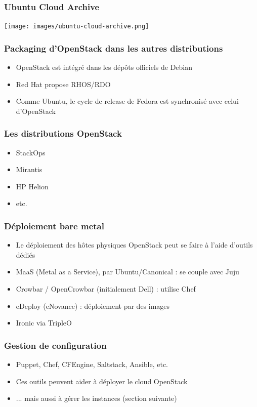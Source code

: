  \begin{frame}
    \frametitle{Ubuntu Cloud Archive}
    \texttt{[image: images/ubuntu-cloud-archive.png]}
  \end{frame}

  \begin{frame}
    \frametitle{Packaging d'OpenStack dans les autres distributions}
    \begin{itemize}
      \item OpenStack est intégré dans les dépôts officiels de Debian
      \item Red Hat propose RHOS/RDO
      \item Comme Ubuntu, le cycle de release de Fedora est synchronisé avec celui d'OpenStack
    \end{itemize}
  \end{frame}

  \begin{frame}
    \frametitle{Les distributions OpenStack}
    \begin{itemize}
      \item StackOps
      \item Mirantis
      \item HP Helion
      \item etc.
    \end{itemize}
  \end{frame}

  \begin{frame}
    \frametitle{Déploiement bare metal}
    \begin{itemize}
      \item Le déploiement des hôtes physiques OpenStack peut se faire à l'aide d'outils dédiés\pause
      \item MaaS (Metal as a Service), par Ubuntu/Canonical : se couple avec Juju
      \item Crowbar / OpenCrowbar (initialement Dell) : utilise Chef
      \item eDeploy (eNovance) : déploiement par des images\pause
      \item Ironic via TripleO
    \end{itemize}
  \end{frame}

  \begin{frame}
    \frametitle{Gestion de configuration}
    \begin{itemize}
      \item Puppet, Chef, CFEngine, Saltstack, Ansible, etc.\pause
      \item Ces outils peuvent aider à déployer le cloud OpenStack
      \item ... mais aussi à gérer les instances (section suivante)
    \end{itemize}
  \end{frame}

